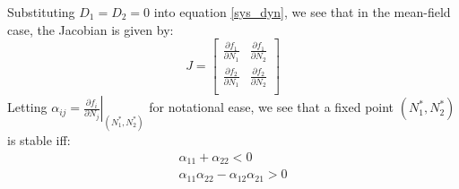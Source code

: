 Substituting $D_1 = D_2 = 0$ into equation \eqref{sys_dyn}, we see that in the mean-field case, the Jacobian is given by:
\begin{equation*}
	J = \begin{bmatrix}
		\frac{\partial f_1}{\partial N_1} & \frac{\partial f_1}{\partial N_2}\\
		\frac{\partial f_2}{\partial N_1} & \frac{\partial f_2}{\partial N_2}\\
	\end{bmatrix}
\end{equation*}
Letting $\alpha_{ij} = \left.\frac{\partial f_i}{\partial N_j}\right\vert_{(N_{1}^*,N_{2}^*)}$ for notational ease, we see that a fixed point $(N_{1}^*,N_{2}^*)$ is stable iff:
\begin{equation}
	\label{MFE_stability}
	\begin{aligned}
		\alpha_{11} + \alpha_{22} < 0\\
		\alpha_{11}\alpha_{22} - \alpha_{12}\alpha_{21} > 0
	\end{aligned}
\end{equation}
\bigskip
